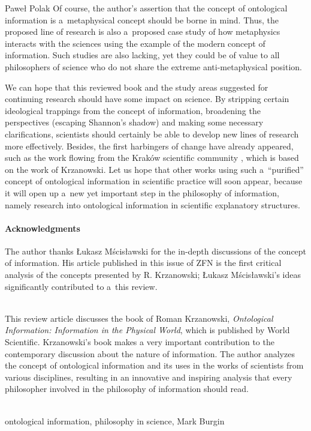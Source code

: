 \begin{newrevengenv}{Paweł Polak}
Of course, the author's assertion that the concept of ontological information is a~metaphysical concept should be borne in mind. Thus, the proposed line of research is also a~proposed case study of how metaphysics interacts with the sciences using the example of the modern concept of information. Such studies are also lacking, yet they could be of value to all philosophers of science who do not share the extreme anti-metaphysical position.

We can hope that this reviewed book and the study areas suggested for continuing research should have some impact on science. By stripping certain ideological trappings from the concept of information, broadening the perspectives (escaping Shannon's shadow) and making some necessary clarifications, scientists should certainly be able to develop new lines of research more effectively. Besides, the first harbingers of change have already appeared, such as the work flowing from the Kraków scientific community
\parencite[][]{bielecki_information_2022}, %
 which is based on the work of Krzanowski. Let us hope that other works using such a~``purified'' concept of ontological information in scientific practice will soon appear, because it will open up a~new yet important step in the philosophy of information, namely research into ontological information in scientific explanatory structures.

\paragraph{Acknowledgments}

The author thanks Łukasz Mścisławski for the in-depth discussions of the concept of information. His article
\parencite[][]{mscislawski_is_2022} %
 published in this issue of ZFN is the first critical analysis of the concepts presented by R. Krzanowski; Łukasz Mścisławski's ideas significantly contributed to a~this review.


\vspace{15mm}%
{}\\
{This review article discusses the book of Roman Krzanowski, \textit{Ontological Information: Information in the Physical World}, which is published by World Scientific. Krzanowski’s book makes a very important contribution to the contemporary discussion about the nature of information. The author analyzes the concept of ontological information and its uses in the works of scientists from various disciplines, resulting in an innovative and inspiring analysis that every philosopher involved in the philosophy of information should read.}\par%
\vspace{2mm}%
{}\\
{ontological information, philosophy in science, Mark Burgin}%



\end{newrevengenv}